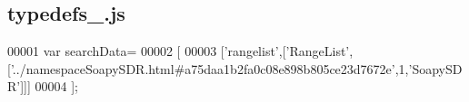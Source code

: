 \subsection{typedefs\+\_.\+js}
\label{typedefs__6_8js_source}

\begin{DoxyCode}
00001 var searchData=
00002 [
00003   [\textcolor{stringliteral}{'rangelist'},[\textcolor{stringliteral}{'RangeList'},[\textcolor{stringliteral}{'../namespaceSoapySDR.html#a75daa1b2fa0c08e898b805ce23d7672e'},1,\textcolor{stringliteral}{'SoapySDR'}]]]
00004 ];
\end{DoxyCode}
